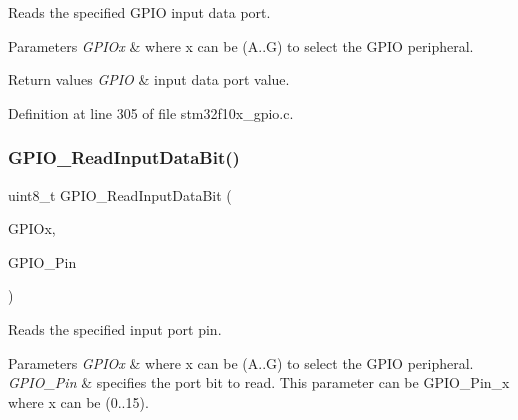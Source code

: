 Reads the specified G\+P\+IO input data port. 


\begin{DoxyParams}{Parameters}
{\em G\+P\+I\+Ox} & where x can be (A..G) to select the G\+P\+IO peripheral. \\
\hline
\end{DoxyParams}

\begin{DoxyRetVals}{Return values}
{\em G\+P\+IO} & input data port value. \\
\hline
\end{DoxyRetVals}


Definition at line 305 of file stm32f10x\+\_\+gpio.\+c.

\mbox{\label{group___g_p_i_o___exported___functions_ga98772ef6b639b3fa06c8ae5ba28d3aaa}} 
\subsubsection{\texorpdfstring{G\+P\+I\+O\+\_\+\+Read\+Input\+Data\+Bit()}{GPIO\_ReadInputDataBit()}}
{\footnotesize\ttfamily uint8\+\_\+t G\+P\+I\+O\+\_\+\+Read\+Input\+Data\+Bit (\begin{DoxyParamCaption}\item[{\hyperlink{struct_g_p_i_o___type_def}{G\+P\+I\+O\+\_\+\+Type\+Def} $\ast$}]{G\+P\+I\+Ox,  }\item[{uint16\+\_\+t}]{G\+P\+I\+O\+\_\+\+Pin }\end{DoxyParamCaption})}



Reads the specified input port pin. 


\begin{DoxyParams}{Parameters}
{\em G\+P\+I\+Ox} & where x can be (A..G) to select the G\+P\+IO peripheral. \\
\hline
{\em G\+P\+I\+O\+\_\+\+Pin} & specifies the port bit to read. This parameter can be G\+P\+I\+O\+\_\+\+Pin\+\_\+x where x can be (0..15). \\
\hline
\end{DoxyParams}

